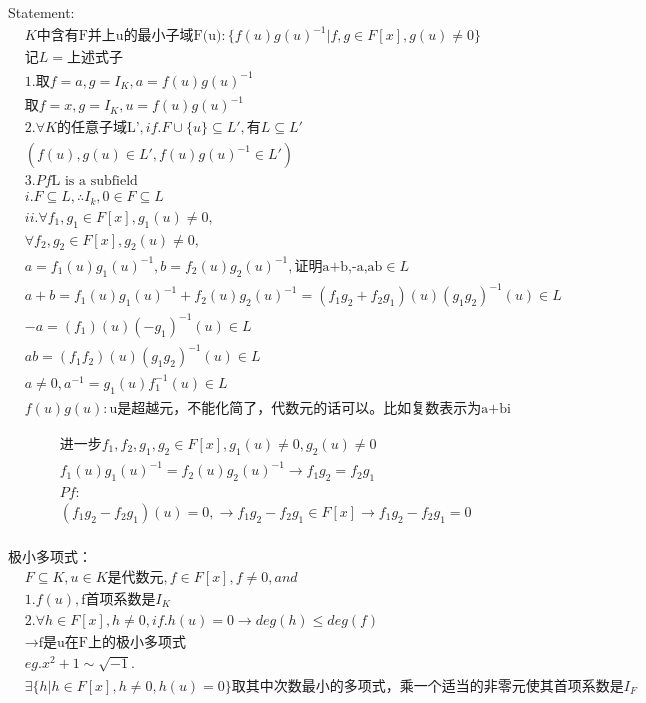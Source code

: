 \documentclass[12pt, a4paper]{article}  %
\begin{document}
Statement:
\begin{align}
    &K\text{中含有F并上{u}的最小子域F(u)}:\{f(u)g(u)^{-1}|f,g\in F[x],g(u)\neq 0\}\\
    &\text{记}L=\text{上述式子}\\
    &1.\text{取}f=a,g=I_K,a=f(u)g(u)^{-1}\\
    &\text{取}f=x,g=I_K,u=f(u)g(u)^{-1}\\
    &2.\forall K\text{的任意子域L'},if. F\cup \{u\}\subseteq L',\text{有}L\subseteq L'\\
    &(f(u),g(u)\in L',f(u)g(u)^{-1}\in L')\\
    &3.Pf\text{L  is  a subfield}\\
    &i.F\subseteq L,\therefore  I_k,0\in F\subseteq L\\
    &ii.\forall f_1,g_1\in F[x],g_1(u)\neq 0,\\
    &\forall f_2,g_2\in F[x],g_2(u)\neq 0,\\
    &a=f_1(u)g_1(u)^{-1},b=f_2(u)g_2(u)^{-1},\text{证明a+b,-a,ab}\in L\\
    &a+b=f_1(u)g_1(u)^{-1}+f_2(u)g_2(u)^{-1}=(f_1g_2+f_2g_1)(u)(g_1g_2)^{-1}(u)\in L\\
    &-a=(f_1)(u)(-g_1)^{-1}(u)\in L\\
    &ab=(f_1f_2)(u)(g_1g_2)^{-1}(u)\in L\\
    &a\neq 0,a^{-1}=g_1(u)f_1^{-1}(u)\in L\\
    &f(u)g(u):\text{u是超越元，不能化简了，代数元的话可以。比如复数表示为a+bi}
\end{align}

\begin{align}
    &\text{进一步}f_1,f_2,g_1,g_2\in F[x],g_1(u)\neq 0,g_2(u)\neq 0\\
    &f_1(u)g_1(u)^{-1}=f_2(u)g_2(u)^{-1 }\rightarrow f_1g_2=f_2g_1\\
    &Pf:\\
    &(f_1g_2-f_2g_1)(u)=0,\rightarrow f_1g_2-f_2g_1\in F[x]\rightarrow f_1g_2-f_2g_1=0\\
\end{align}

极小多项式：
\begin{align}
    &F\subseteq K,u\in K\text{是代数元},f\in F[x],f\neq 0,and\\
    &1.f(u),\text{f首项系数是}I_K\\
    &2.\forall h\in F[x],h\neq 0,if.h(u)=0\rightarrow deg(h)\leq deg(f)\\
    &\rightarrow \text{f是u在F上的极小多项式}\\
    &eg. x^2+1\sim \sqrt{-1}.\\
    &\exists \{h|h\in F[x],h\neq 0,h(u)=0\}\text{取其中次数最小的多项式，乘一个适当的非零元使其首项系数是}I_F
\end{align}
\end{document}
